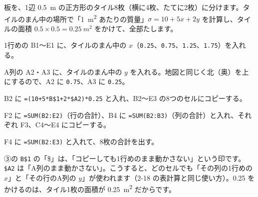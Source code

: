 \begin{yattemiyou}
板を、1辺 \qty{0.5}{m} の正方形のタイル8枚（横に4枚、たてに2枚）に分けます。タイルのまん中の場所で「\qty{1}{m^2} あたりの質量」$\sigma=10+5x+2y$ を計算し、タイルの面積 $0.5\times0.5=\qty{0.25}{m^2}$ をかけて、全部たします。
\begin{enumerate}[label={\bkcircled[bkGreen]{\arabic*}}, leftmargin=2.4\zw, itemsep=1pt, topsep=3pt]
\item 1行めの B1〜E1 に、タイルのまん中の $x$（\texttt{0.25}、\texttt{0.75}、\texttt{1.25}、\texttt{1.75}）を入れる。
\item A列の A2・A3 に、タイルのまん中の $y$ を入れる。地図と同じく北（奥）を上にするので、A2 に \texttt{0.75}、A3 に \texttt{0.25}。
\item B2 に \texttt{=(10+5*B\$1+2*\$A2)*0.25} と入れ、B2〜E3 の8つのセルにコピーする。
\item F2 に \texttt{=SUM(B2:E2)}（行の合計）、B4 に \texttt{=SUM(B2:B3)}（列の合計）と入れ、それぞれ F3、C4〜E4 にコピーする。
\item F4 に \texttt{=SUM(B2:E3)} と入れて、8枚の合計を出す。
\end{enumerate}
\end{yattemiyou}

\noindent ③の \texttt{B\$1} の「\$」は、「コピーしても1行めのまま動かさない」という印です。\texttt{\$A2} は「A列のまま動かさない」。こうすると、どのセルでも「その列の1行めの $x$」と「その行のA列の $y$」が使われます（2-18 の表計算と同じ使い方）。0.25 をかけるのは、タイル1枚の面積が \qty{0.25}{m^2} だからです。

\begin{bkcenter}
\label{bk:8-6:tab-sheet}
\end{bkcenter}

\begin{omoidasou}
\end{omoidasou}

